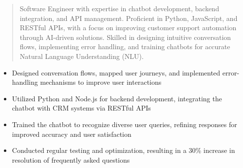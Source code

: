 



\makecvheader

\begin{quote}
  \noindent
  Software Engineer with expertise in chatbot development, backend integration, and API management. Proficient in Python, JavaScript, and RESTful APIs, with a focus on improving customer support automation through AI-driven solutions. Skilled in designing intuitive conversation flows, implementing error handling, and training chatbots for accurate Natural Language Understanding (NLU).
\end{quote}

\par\smallskip
\noindent
\begin{minipage}{20cm}
  \begin{minipage}{9.75cm}
    \begin{itemize}
      \item Designed conversation flows, mapped user journeys, and implemented error-handling mechanisms to improve user interactions
      \item Utilized Python and Node.js for backend development, integrating the chatbot with CRM systems via RESTful APIs
    \end{itemize}
  \end{minipage}
  \hfill
  \begin{minipage}{9.75cm}
    \begin{itemize}
      \item Trained the chatbot to recognize diverse user queries, refining responses for improved accuracy and user satisfaction
      \item Conducted regular testing and optimization, resulting in a 30\% increase in resolution of frequently asked questions
    \end{itemize}
  \end{minipage}
\end{minipage}
\par\smallskip
\divider

